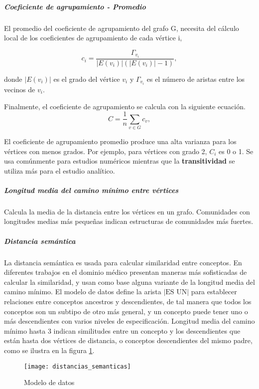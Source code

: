 \subparagraph{Coeficiente de agrupamiento - Promedio}\cite{Saramaki2006,Kaiser2008}
El promedio del coeficiente de agrupamiento del grafo G, necesita del cálculo local de los coeficientes de agrupamiento de cada vértice i,

\begin{equation}
c_{i} = \frac{\Gamma_{v_{i}}}{|E(v_{i})|(|E(v_{i})|-1)},
\end{equation}

donde $|E(v_{i})|$ es el grado del vértice $v_{i}$ y $\Gamma_{v_{i}}$ es el número de aristas entre los vecinos de $v_{i}$.

Finalmente, el coeficiente de agrupamiento se calcula con la siguiente ecuación.
\begin{equation}
C = \frac{1}{n}\sum_{v \in G} c_v,
\end{equation}

El coeficiente de agrupamiento promedio produce una alta varianza para los vértices con menos grados. Por ejemplo, para vértices con grado 2, $C_{i}$ es 0 o 1. Se usa comúnmente para estudios numéricos mientras que la \textbf{transitividad} se utiliza más para el estudio analítico.\cite{Tang2010}

\subparagraph{Longitud media del camino mínimo entre vértices}
Calcula la media de la distancia entre los vértices en un grafo. Comunidades con longitudes medias más pequeñas indican estructuras de comunidades más fuertes.

\subparagraph{Distancia semántica}
La distancia semántica es usada para calcular similaridad entre conceptos. En diferentes trabajos en el dominio médico \cite{Wang2010,Gan2013,Pedersen2007,Zare2015ASNOMED-CT} presentan maneras más sofisticadas de calcular la similaridad, y usan como base alguna variante de la longitud media del camino mínimo.
El modelo de datos define la arista $|\text{ES UN}|$ para establecer relaciones entre conceptos ancestros y descendientes, de tal manera que todos los conceptos son un subtipo de otro más general, y un concepto puede tener uno o más descendientes con varios niveles de especificación. Longitud media del camino mínimo hasta 3 indican similitudes entre un concepto y los descendientes que están hasta dos vértices de distancia, o conceptos descendientes del mismo padre, como se ilustra en la figura \ref{fig:distancias_semanticas}.

\begin{figure}[ht]
\caption{Modelo de datos}
\label{fig:distancias_semanticas}
\centering
\texttt{[image: distancias\_semanticas]}
\end{figure}



